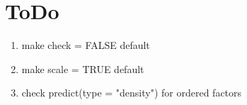 
\section{ToDo}

\begin{enumerate}
\item make check = FALSE default
\item make scale = TRUE default
\item check predict(type = "density") for ordered factors
\end{enumerate}
